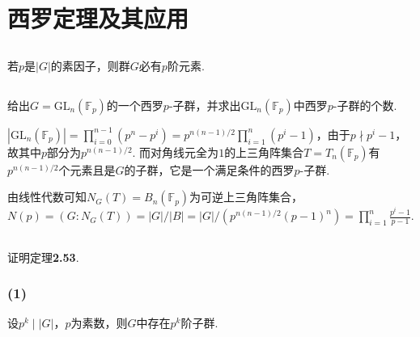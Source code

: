 \section{西罗定理及其应用}
\subsection{}
若$p$是$|G|$的素因子，则群$G$必有$p$阶元素.


\subsection{}
给出$G=\mathrm{GL}_n(\mathbb{F}_p)$的一个西罗$p$-子群，并求出$\mathrm{GL}_n(\mathbb{F}_p)$中西罗$p$-子群的个数.

\jie $|\mathrm{GL}_n(\mathbb{F}_p)|=\prod_{i=0}^{n-1}(p^n-p^i)=p^{n(n-1)/2}\prod_{i=1}^{n}(p^i-1)$，由于$p\nmid p^i-1$，故其中$p$部分为$p^{n(n-1)/2}$. 而对角线元全为$1$的上三角阵集合$T=T_n(\mathbb{F}_p)$有$p^{n(n-1)/2}$个元素且是$G$的子群，它是一个满足条件的西罗$p$-子群.

由线性代数可知$N_G(T)=B_n(\mathbb{F}_p)$为可逆上三角阵集合，$N(p)=(G:N_G(T))=|G|/|B|
=|G|/(p^{n(n-1)/2}(p-1)^n)=\prod_{i=1}^n\frac{p^i-1}{p-1}$.

\subsection{}
证明{\heiti 定理}\textbf{2.53}.

\subsubsection{(1)}
设$p^k\mid |G|$，$p$为素数，则$G$中存在$p^k$阶子群.


